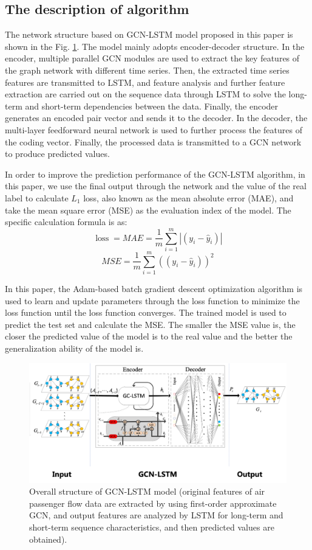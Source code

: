 \documentclass[journal,article,submit,moreauthors,pdftex]{Definitions/mdpi}
\begin{document}
\subsection{The description of algorithm}
The network structure based on GCN-LSTM model proposed in this paper is shown in the Fig. \ref{fig:GCN-LSTM}. The model mainly adopts encoder-decoder structure. In the encoder, multiple parallel GCN modules are used to extract the key features of the graph network with different time series. Then, the extracted time series features are transmitted to LSTM, and feature analysis and further feature extraction are carried out on the sequence data through LSTM to solve the long-term and short-term dependencies between the data. Finally, the encoder generates an encoded pair vector and sends it to the decoder. In the decoder, the multi-layer feedforward neural network is used to further process the features of the coding vector. Finally, the processed data is transmitted to a GCN network to produce predicted values.
\par  In order to improve the prediction performance of the GCN-LSTM algorithm, in this paper, we use the final output through the network and the value of the real label to calculate $L_{1}$ loss, also known as the mean absolute error (MAE), and take the mean square error (MSE) as the evaluation index of the model. The specific calculation formula is as:
\begin{equation}
    \operatorname{loss}=M A E=\frac{1}{m} \sum_{i=1}^{m}\left|\left(y_{i}-\hat{y}_{i}\right)\right|
\end{equation}
\begin{equation}
    M S E=\frac{1}{m} \sum_{i=1}^{m}\left(\left(y_{i}-\hat{y}_{i}\right)\right)^{2}
\end{equation}
\par In this paper, the Adam-based batch gradient descent optimization algorithm  is used to learn and update parameters through the loss function to minimize the loss function until the loss function converges. The trained model is used to predict the test set and calculate the MSE. The smaller the MSE value is, the closer the predicted value of the model is to the real value and the better the generalization ability of the model is.
\begin{figure}[htbp]
    \centering
    \includegraphics[width=12 cm]{./imgs/GCN-LSTM.png}
    \caption{Overall structure of GCN-LSTM model (original features of air passenger flow data are extracted by using first-order approximate GCN, and output features are analyzed by LSTM for long-term and short-term sequence characteristics, and then predicted values are obtained).}
    \label{fig:GCN-LSTM}
\end{figure}
\end{document}
